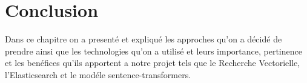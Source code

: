 \section{Conclusion}
\noindent
Dans ce chapitre on a presenté et expliqué les approches qu'on a décidé de prendre ainsi que les technologies qu'on a utilisé et leurs importance, pertinence et les benéfices qu'ils apportent a notre projet tels que le Recherche Vectorielle, l'Elasticsearch et le modéle sentence-transformers.